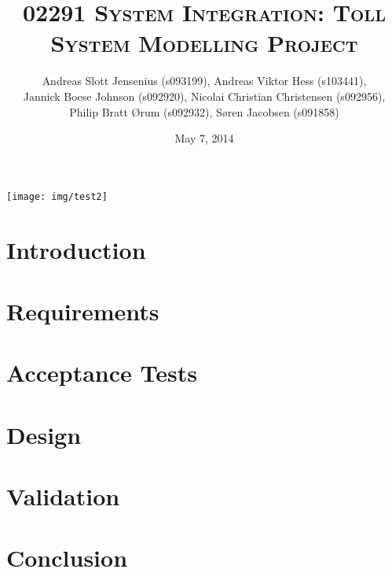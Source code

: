 \documentclass[11pt]{report}
\begin{document}
\title{\textsc{02291 System Integration: Toll System Modelling Project}}
\date{May 7, 2014}
\author{Andreas Slott Jensenius (s093199), Andreas Viktor Hess (s103441),\\
        Jannick Boese Johnson (s092920), Nicolai Christian Christensen (s092956),\\
        Philip Bratt Ørum (s092932), Søren Jacobsen (s091858)}
        

\maketitle

\fancyhead{}
\fancyfoot{}
\fancyfoot[C]{\thepage}

\pagestyle{fancy}

\tableofcontents

\texttt{[image: img/test2]}

\chapter{Introduction}



\chapter{Requirements}


\chapter{Acceptance Tests}


\chapter{Design}


\chapter{Validation}


\chapter{Conclusion}

\end{document}

